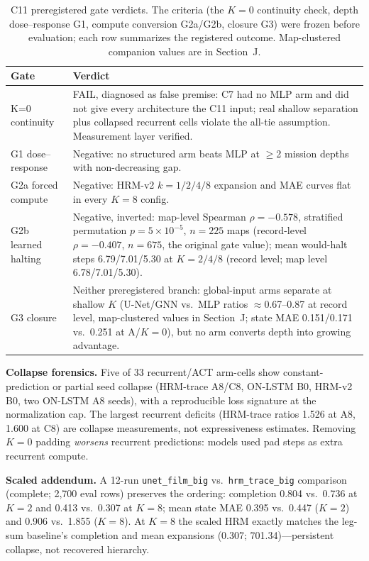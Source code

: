 \documentclass[letterpaper]{article} %
\newcommand{\stage}[1]{\textsc{#1}}
\begin{document}
\begin{table}[t]
\centering
\footnotesize
\begin{tabular}{@{}lp{5.2cm}@{}}
\toprule
Gate & Verdict \\
\midrule
K=0 continuity & FAIL, diagnosed as false premise: \stage{C7} had no MLP arm and did not give every architecture the \stage{C11} input; real shallow separation plus collapsed recurrent cells violate the all-tie assumption. Measurement layer verified. \\
G1 dose--response & Negative: no structured arm beats MLP at $\geq$2 mission depths with non-decreasing gap. \\
G2a forced compute & Negative: HRM-v2 $k{=}1/2/4/8$ expansion and MAE curves flat in every $K{=}8$ config. \\
G2b learned halting & Negative, inverted: map-level Spearman $\rho{=}-0.578$, stratified permutation $p{=}5{\times}10^{-5}$, $n{=}225$ maps (record-level $\rho{=}-0.407$, $n{=}675$, the original gate value); mean would-halt steps 6.79/7.01/5.30 at $K{=}2/4/8$ (record level; map level 6.78/7.01/5.30). \\
G3 closure & Neither preregistered branch: global-input arms separate at shallow $K$ (U-Net/GNN vs.\ MLP ratios $\approx$0.67--0.87 at record level, map-clustered values in Section~J; state MAE 0.151/0.171 vs.\ 0.251 at A/$K{=}0$), but no arm converts depth into growing advantage. \\
\bottomrule
\end{tabular}
\caption{\stage{C11} preregistered gate verdicts. The criteria (the $K{=}0$ continuity check, depth dose--response G1, compute conversion G2a/G2b, closure G3) were frozen before evaluation; each row summarizes the registered outcome. Map-clustered companion values are in Section~J.}
\label{tab:c11gates}
\end{table}

\textbf{Collapse forensics.} Five of 33 recurrent/ACT arm-cells show constant-prediction or partial seed collapse (HRM-trace A8/C8, ON-LSTM B0, HRM-v2 B0, two ON-LSTM A8 seeds), with a reproducible loss signature at the normalization cap. The largest recurrent deficits (HRM-trace ratios 1.526 at A8, 1.600 at C8) are collapse measurements, not expressiveness estimates. Removing $K{=}0$ padding \emph{worsens} recurrent predictions: models used pad steps as extra recurrent compute.

\textbf{Scaled addendum.} A 12-run \texttt{unet\_film\_big} vs.\ \texttt{hrm\_trace\_big} comparison (complete; 2{,}700 eval rows) preserves the ordering: completion 0.804 vs.\ 0.736 at $K{=}2$ and 0.413 vs.\ 0.307 at $K{=}8$; mean state MAE 0.395 vs.\ 0.447 ($K{=}2$) and 0.906 vs.\ 1.855 ($K{=}8$). At $K{=}8$ the scaled HRM exactly matches the leg-sum baseline's completion and mean expansions (0.307; 701.34)---persistent collapse, not recovered hierarchy.
\end{document}
